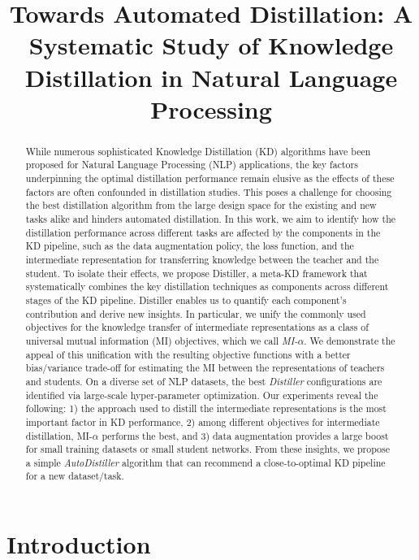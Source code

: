 \documentclass[11pt]{article}
\title{Towards Automated Distillation: A Systematic Study of Knowledge Distillation in Natural Language Processing}
\author[1]{\nameemail{Author 1}{email1@example.com}}
\affil[1]{Institution 1}
\begin{document}
\maketitle

\begin{abstract}
While numerous sophisticated Knowledge Distillation (KD) algorithms have been proposed for Natural Language Processing (NLP) applications, the key factors underpinning the optimal distillation performance remain elusive as the effects of these factors are often confounded in distillation studies.
This poses a challenge for choosing the best distillation algorithm from the large design space for the existing and new tasks alike and hinders automated distillation. In this work, we aim to identify how the distillation performance across different tasks are affected by the components in the KD pipeline, such as the data augmentation policy, the loss function, and the intermediate representation for transferring knowledge between the teacher and the student. To isolate their effects, we propose Distiller, a meta-KD framework that systematically combines the key distillation techniques as components across different stages of the KD pipeline. Distiller enables us to quantify each component's contribution and derive new insights. In particular, we unify the commonly used objectives for the knowledge transfer of intermediate representations as a class of universal mutual information (MI) objectives, which we call \emph{MI-$\alpha$}. We demonstrate the appeal of this unification with the resulting objective functions with a better bias/variance trade-off for estimating the MI between the representations of teachers and students.
On a diverse set of NLP datasets, the best \emph{Distiller} configurations are identified via large-scale hyper-parameter optimization.
Our experiments reveal the following:
1) the approach used to distill the intermediate representations is the most important factor in KD performance,
2) among different objectives for intermediate distillation, MI-$\alpha$ performs the best, and
3) data augmentation provides a large boost for small training datasets or small student networks.
From these insights, we propose a simple \emph{AutoDistiller} algorithm that can recommend a close-to-optimal KD pipeline for a new dataset/task.
\end{abstract}
\section{Introduction}
\end{document}
